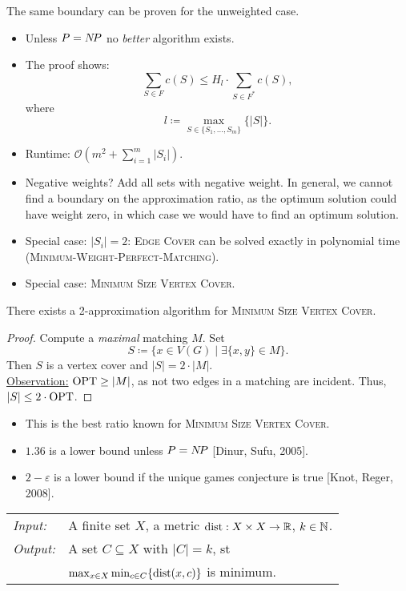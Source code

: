 \documentclass[../skript.tex]{subfiles}
\begin{document}
The same boundary can be proven for the unweighted case. \\
\begin{remark}
\begin{itemize}
\item Unless $P = N \! P$ no \textit{better} algorithm exists.
\item The proof shows:
\[
	\sum_{S \in F} c(S) \leq H_l \cdot \sum_{S \in F^*} c(S),
\]
where
\[
	l \coloneqq \max_{S \in \{S_1, \ldots, S_m\}} \{ |S| \}.
\]
\item Runtime: $\mathcal{O}(m^2 + \sum_{i=1}^m |S_i|)$.
\item Negative weights? Add all sets with negative weight. In general, we cannot find a boundary on the approximation ratio, as the optimum solution could have weight zero, in which case we would have to find an optimum solution.
\item Special case: $|S_i| = 2$: \textsc{Edge Cover} can be solved exactly in polynomial time (\textsc{Minimum-Weight-Perfect-Matching}).
\item Special case: \textsc{Minimum Size Vertex Cover}.
\end{itemize}
\end{remark}
\begin{theorem} %
There exists a 2-approximation algorithm for \textsc{Minimum Size Vertex Cover}.
\end{theorem}
\begin{proof}
Compute a \textit{maximal} matching $M$. Set
\[
	S \coloneqq \{ x \in V(G) \mid \exists \{ x, y\} \in M\}.
\]
Then $S$ is a vertex cover and $|S| = 2 \cdot |M|$. \\
\underline{Observation:} $\operatorname{OPT} \geq |M|$, as not two edges in a matching are incident.
Thus, $|S| \leq 2 \cdot \operatorname{OPT}$.
\end{proof}
\begin{remark}
\begin{itemize}
\item This is the best ratio known for \textsc{Minimum Size Vertex Cover}.
\item $1.36$ is a lower bound unless $P = N \! P$ [Dinur, Sufu, 2005].
\item $2-\varepsilon$ is a lower bound if the unique games conjecture is true [Knot, Reger, 2008].
\end{itemize}
\end{remark}
\begin{problem}[$k$-Center]
\begin{tabular}{@{}ll}
\textit{Input:} & A finite set $X$, a metric $\operatorname*{dist} : X \times X \to \mathbb{R}$, $k \in \mathbb{N}$. \\
\textit{Output:} & A set $C \subseteq X$ with $|C| = k$, \ac{st} \\
&$\max_{x \in X} \min_{c \in C} \{\operatorname*{dist}(x, c)\}$ is minimum.
\end{tabular}
\end{problem}
\end{document}
